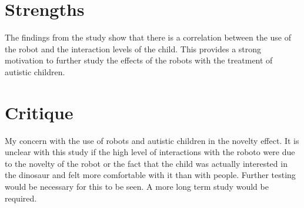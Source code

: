 \documentclass{article}
\begin{document}
\section*{Strengths}
The findings from the study show that there is a correlation between the use of the robot and the interaction levels of the child. This provides a strong motivation to further study the effects of the robots with the treatment of autistic children.
\section*{Critique}
My concern with the use of robots and autistic children in the novelty effect. It is unclear with this study if the high level of interactions with the roboto were due to the novelty of the robot or the fact that the child was actually interested in the dinosaur and felt more comfortable with it than with people. Further testing would be necessary for this to be seen. A more long term study would be required.
\cite{goossens93}
\end{document}
